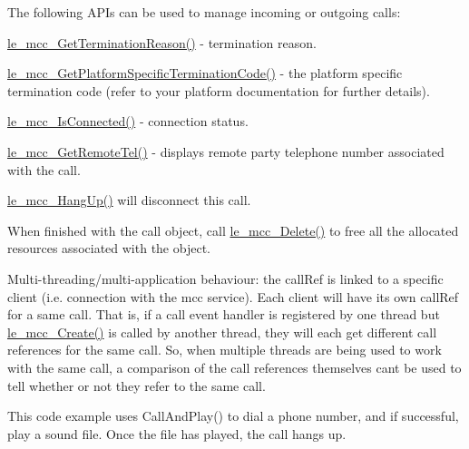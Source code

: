 The following A\+P\+Is can be used to manage incoming or outgoing calls\+:
\begin{DoxyItemize}
\item \hyperlink{le__mcc__interface_8h_ab16921abc02e0569b129f4a7d92bf3c9}{le\+\_\+mcc\+\_\+\+Get\+Termination\+Reason()} -\/ termination reason.
\item \hyperlink{le__mcc__interface_8h_a68b9b8ed1b221924dcea1be0fd610a54}{le\+\_\+mcc\+\_\+\+Get\+Platform\+Specific\+Termination\+Code()} -\/ the platform specific termination code (refer to your platform documentation for further details).
\item \hyperlink{le__mcc__interface_8h_a07e4856dffdbf887f51879e39ec43e42}{le\+\_\+mcc\+\_\+\+Is\+Connected()} -\/ connection status.
\item \hyperlink{le__mcc__interface_8h_aeae32829e9a5fa864167df3ee67d0f41}{le\+\_\+mcc\+\_\+\+Get\+Remote\+Tel()} -\/ displays remote party telephone number associated with the call.
\item \hyperlink{le__mcc__interface_8h_a7b9567715a3cd30c83a3b6886eeb2044}{le\+\_\+mcc\+\_\+\+Hang\+Up()} will disconnect this call.
\end{DoxyItemize}

When finished with the call object, call \hyperlink{le__mcc__interface_8h_a1a016e6443df2d3ee99113649f4f34ae}{le\+\_\+mcc\+\_\+\+Delete()} to free all the allocated resources associated with the object.

Multi-\/threading/multi-\/application behaviour\+: the call\+Ref is linked to a specific client (i.\+e. connection with the mcc service). Each client will have its own call\+Ref for a same call. That is, if a call event handler is registered by one thread but \hyperlink{le__mcc__interface_8h_aeee65430506230b5744701d08ff8dac4}{le\+\_\+mcc\+\_\+\+Create()} is called by another thread, they will each get different call references for the same call. So, when multiple threads are being used to work with the same call, a comparison of the call references themselves can\textquotesingle{}t be used to tell whether or not they refer to the same call.

This code example uses {\ttfamily Call\+And\+Play()} to dial a phone number, and if successful, play a sound file. Once the file has played, the call hangs up.


